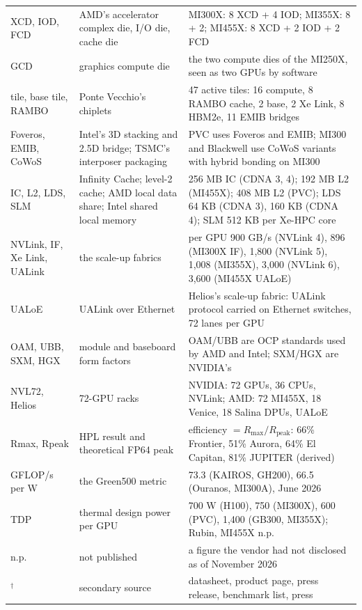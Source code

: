 \documentclass[11pt,letterpaper]{article}
\begin{document}
\begin{center}
\begin{tabular}{@{}lp{4.7cm}p{7.0cm}@{}}
XCD, IOD, FCD & AMD's accelerator complex die, I/O die, cache die & MI300X: 8 XCD + 4 IOD; MI355X: 8 + 2; MI455X: 8 XCD + 2 IOD + 2 FCD\\
GCD & graphics compute die & the two compute dies of the MI250X, seen as two GPUs by software\\
tile, base tile, RAMBO & Ponte Vecchio's chiplets & 47 active tiles: 16 compute, 8 RAMBO cache, 2 base, 2 Xe Link, 8 HBM2e, 11 EMIB bridges\\
Foveros, EMIB, CoWoS & Intel's 3D stacking and 2.5D bridge; TSMC's interposer packaging & PVC uses Foveros and EMIB; MI300 and Blackwell use CoWoS variants with hybrid bonding on MI300\\
IC, L2, LDS, SLM & Infinity Cache; level-2 cache; AMD local data share; Intel shared local memory & 256 MB IC (CDNA 3, 4); 192 MB L2 (MI455X); 408 MB L2 (PVC); LDS 64 KB (CDNA 3), 160 KB (CDNA 4); SLM 512 KB per Xe-HPC core\\
NVLink, IF, Xe Link, UALink & the scale-up fabrics & per GPU 900 GB/s (NVLink 4), 896 (MI300X IF), 1{,}800 (NVLink 5), 1{,}008 (MI355X), 3{,}000 (NVLink 6), 3{,}600 (MI455X UALoE)\\
UALoE & UALink over Ethernet & Helios's scale-up fabric: UALink protocol carried on Ethernet switches, 72 lanes per GPU\\
OAM, UBB, SXM, HGX & module and baseboard form factors & OAM/UBB are OCP standards used by AMD and Intel; SXM/HGX are NVIDIA's\\
NVL72, Helios & 72-GPU racks & NVIDIA: 72 GPUs, 36 CPUs, NVLink; AMD: 72 MI455X, 18 Venice, 18 Salina DPUs, UALoE\\
Rmax, Rpeak & HPL result and theoretical FP64 peak & efficiency $= R_{\max}/R_{\text{peak}}$: 66\% Frontier, 51\% Aurora, 64\% El Capitan, 81\% JUPITER (derived)\\
GFLOP/s per W & the Green500 metric & 73.3 (KAIROS, GH200), 66.5 (Ouranos, MI300A), June 2026\\
TDP & thermal design power per GPU & 700 W (H100), 750 (MI300X), 600 (PVC), 1{,}400 (GB300, MI355X); Rubin, MI455X n.p.\\
n.p. & not published & a figure the vendor had not disclosed as of November 2026\\
$^\dagger$ & secondary source & datasheet, product page, press release, benchmark list, press\\
\bottomrule
\end{tabular}
\end{center}
\end{document}
